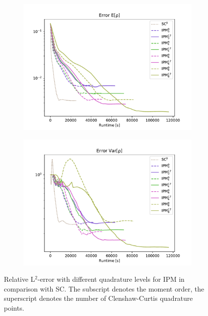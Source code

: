 \begin{figure}[h!]
\centering
\centering
	\begin{subfigure}{0.5\linewidth}
		\centering
				\includegraphics[scale=0.544]{figs/StudyQuadrature/L2_error_E[rho]_new.pdf}
		\caption{}
		\label{fig:ErrorDifferentQuadA}
	\end{subfigure}%
	\begin{subfigure}{0.5\linewidth}
		\centering
				\includegraphics[scale=0.544]{figs/StudyQuadrature/L2_error_Var[rho]_new.pdf}
		\caption{}
		\label{fig:ErrorDifferentQuadB}
	\end{subfigure}
	\caption{Relative L$^2$-error with different quadrature levels for IPM in comparison with SC. The subscript denotes the moment order, the superscript denotes the number of Clenshaw-Curtis quadrature points.}
	\label{fig:ErrorDifferentQuad}
\end{figure}
